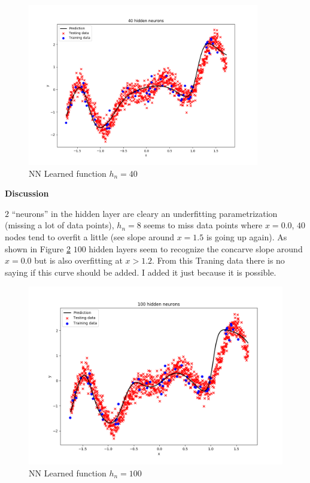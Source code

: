 \documentclass[12pt,a4paper]{article}
\begin{document}
\begin{enumerate}[a)]
\begin{figure}[H]
	\centering
  \includegraphics[width=0.9\textwidth]{figures/1_1_a_hn_40.png}
	\caption{NN Learned function $h_n=40$}
	\label{1_1_a_hn_40}
\end{figure}
  
\textbf{Discussion}

$2$ ``neurons'' in the hidden layer are cleary an underfitting parametrization
(missing a lot of data points), $h_n = 8$ seems to miss data points where $ x =
0.0$, $40$ nodes tend to overfit a little (see slope around $x = 1.5$ is going
up again). As shown in Figure \ref{1_1_a_hn_100} $100$ hidden layers seem to
recognize the concarve slope around $x = 0.0$ but is also overfitting at $x >
1.2$. From this Traning data there is no saying if this curve should be added. I
added it just because it is possible.

\begin{figure}[H]
	\centering
  \includegraphics[width=\textwidth]{figures/1_1_a_hn_100.png}
	\caption{NN Learned function $h_n=100$}
	\label{1_1_a_hn_100}
\end{figure}


\end{enumerate}
\end{document}
